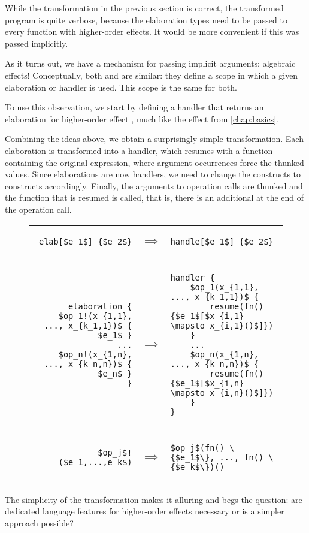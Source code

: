 
While the transformation in the previous section is correct, the transformed program is quite verbose, because the elaboration types need to be passed to every function with higher-order effects. It would be more convenient if this was passed implicitly.

As it turns out, we have a mechanism for passing implicit arguments: algebraic effects! Conceptually, both  and  are similar: they define a scope in which a given elaboration or handler is used. This scope is the same for both.

To use this observation, we start by defining a handler that returns an elaboration for higher-order effect , much like the  effect from \cref{chap:basics}.

Combining the ideas above, we obtain a surprisingly simple transformation. Each elaboration is transformed into a handler, which resumes with a function containing the original expression, where argument occurrences force the thunked values. Since elaborations are now handlers, we need to change the  constructs to  constructs accordingly. Finally, the arguments to operation calls are thunked and the function that is resumed is called, that is, there is an additional \el{()} at the end of the operation call.

\begin{figure}[H]
\begin{tabular}{rcl}
\begin{lstlisting}
elab[$e_1$] {$e_2$}
\end{lstlisting}
& $\implies$
& \begin{lstlisting}
handle[$e_1$] {$e_2$}
\end{lstlisting}
\\\\
\begin{lstlisting}
elaboration {
    $op_1!(x_{1,1}, ..., x_{k_1,1})$ { $e_1$ }
    ...
    $op_n!(x_{1,n}, ..., x_{k_n,n})$ { $e_n$ }
}
\end{lstlisting}
&$\implies$
&\begin{lstlisting}
handler {
    $op_1(x_{1,1}, ..., x_{k_1,1})$ {
        resume(fn() {$e_1$[$x_{i,1} \mapsto x_{i,1}()$]})
    }
    ...
    $op_n(x_{1,n}, ..., x_{k_n,n})$ {
        resume(fn() {$e_1$[$x_{i,n} \mapsto x_{i,n}()$]})
    }
}
\end{lstlisting}
\\\\
\begin{lstlisting}
$op_j$!($e_1,...,e_k$)
\end{lstlisting}
& $\implies$
& \begin{lstlisting}
$op_j$(fn() \{$e_1$\}, ..., fn() \{$e_k$\})()
\end{lstlisting}
\end{tabular}
\end{figure}

The simplicity of the transformation makes it alluring and begs the question: are dedicated language features for higher-order effects necessary or is a simpler approach possible?

